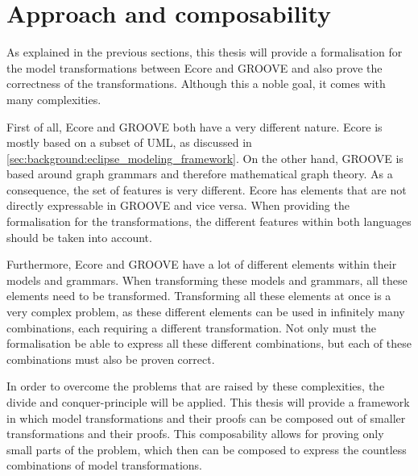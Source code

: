 \section{Approach and composability}
\label{sec:introduction:approach}

As explained in the previous sections, this thesis will provide a formalisation for the model transformations between Ecore and GROOVE and also prove the correctness of the transformations. Although this a noble goal, it comes with many complexities.

First of all, Ecore and GROOVE both have a very different nature. Ecore is mostly based on a subset of UML, as discussed in \cref{sec:background:eclipse_modeling_framework}. On the other hand, GROOVE is based around graph grammars and therefore mathematical graph theory. As a consequence, the set of features is very different. Ecore has elements that are not directly expressable in GROOVE and vice versa. When providing the formalisation for the transformations, the different features within both languages should be taken into account.

Furthermore, Ecore and GROOVE have a lot of different elements within their models and grammars. When transforming these models and grammars, all these elements need to be transformed. Transforming all these elements at once is a very complex problem, as these different elements can be used in infinitely many combinations, each requiring a different transformation. Not only must the formalisation be able to express all these different combinations, but each of these combinations must also be proven correct.

In order to overcome the problems that are raised by these complexities, the divide and conquer-principle will be applied. This thesis will provide a framework in which model transformations and their proofs can be composed out of smaller transformations and their proofs. This composability allows for proving only small parts of the problem, which then can be composed to express the countless combinations of model transformations.
